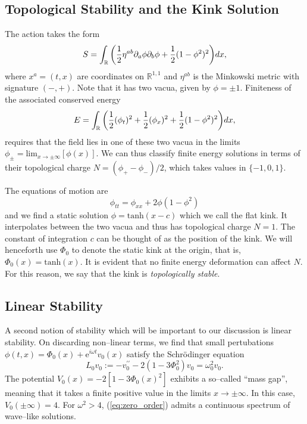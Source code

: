 \subsection{Topological Stability and the Kink Solution}
The action takes the form
\[
S=\int_{\mathbb{R}}\bigg( \frac{1}{2}\eta^{ab}\partial_a\phi\partial_b\phi + \frac{1}{2}(1-\phi^2)^2\bigg)dx,
\]
where $x^a=(t,x)$ are coordinates on $\mathbb{R}^{1,1}$ and $\eta^{ab}$ is the Minkowski metric with signature $(-,+)$. Note that it has two vacua, given by $\phi=\pm 1$. Finiteness of the associated conserved energy
\[
E = \int_{\mathbb{R}} \bigg( \frac{1}{2}(\phi_t)^2 + \frac{1}{2}(\phi_x)^2 + \frac{1}{2}(1-\phi^2)^2 \bigg)dx,
\]
requires that the field lies in one of these two vacua in the limits $\phi_\pm=\mathrm{lim}_{x\rightarrow \pm \infty}[\phi(x)]$. We can thus classify finite energy solutions in terms of their topological charge $N = (\phi_+-\phi_-)/2$, which takes values in $\{-1,0,1\}$.




The equations of motion are
\begin{equation}
\label{eom:R11}
\phi_{tt}=\phi_{xx} + 2\phi(1-\phi^2)
\end{equation}
and we find a static solution $\phi=\mathrm{tanh}(x-c)$ which we call the flat kink. It interpolates between the two vacua and thus has topological charge $N=1$. The constant of integration $c$ can be thought of as the position of the kink. We will henceforth use $\Phi_0$ to denote the static kink at the origin, that is, $\Phi_0(x)=\mathrm{tanh}(x)$. It is evident that no finite energy deformation can affect $N$. For this reason, we say that the kink is \textit{topologically stable}.

\subsection{Linear Stability}

A second notion of stability which will be important to our discussion is linear stability. On discarding non--linear terms, we find that small pertubations $\phi(t,x)=\Phi_0(x)+\mathrm{e}^{i\omega t}v_0(x)$ satisfy the Schr\"odinger equation
\begin{equation}
\label{eq:zero_order}
L_0v_0:=-v_0^{\prime\prime} - 2(1-3\Phi_0^2)v_0 = \omega^2_0v_0.
\end{equation}
The potential $V_0(x)=-2[1-3\Phi_0(x)^2]$ exhibits a so--called ``mass gap'', meaning that it takes a finite positive value in the limits $x\rightarrow\pm\infty$. In this case, $V_0(\pm\infty)=4$. For $\omega^2>4$, (\ref{eq:zero_order}) admits a continuous spectrum of wave--like solutions.

